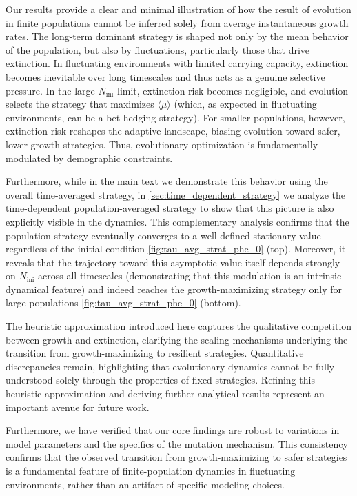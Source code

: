 \documentclass[aps,pre,reprint,10pt,superscriptaddress]{revtex4-2}
\begin{document}
Our results provide a clear and minimal illustration of how the result of evolution in finite populations cannot be inferred solely from average instantaneous growth rates. The long-term dominant strategy is shaped not only by the mean behavior of the population, but also by fluctuations, particularly those that drive extinction. In fluctuating environments with limited carrying capacity, extinction becomes inevitable over long timescales and thus acts as a genuine selective pressure. In the large-$N_\text{ini}$ limit, extinction risk becomes negligible, and evolution selects the strategy that maximizes $\langle\mu\rangle$ (which, as expected in fluctuating environments, can be a bet-hedging strategy). For smaller populations, however, extinction risk reshapes the adaptive landscape, biasing evolution toward safer, lower-growth strategies. Thus, evolutionary optimization is fundamentally modulated by demographic constraints.

Furthermore, while in the main text we demonstrate this behavior using the overall time-averaged strategy, in \cref{sec:time_dependent_strategy} we analyze the time-dependent population-averaged strategy to show that this picture is also explicitly visible in the dynamics. This complementary analysis confirms that the population strategy eventually converges to a well-defined stationary value regardless of the initial condition \cref{fig:tau_avg_strat_phe_0} (top). Moreover, it reveals that the trajectory toward this asymptotic value itself depends strongly on $N_\text{ini}$ across all timescales (demonstrating that this modulation is an intrinsic dynamical feature) and indeed reaches the growth-maximizing strategy only for large populations \cref{fig:tau_avg_strat_phe_0} (bottom).

The heuristic approximation introduced here captures the qualitative competition between growth and extinction, clarifying the scaling mechanisms underlying the transition from growth-maximizing to resilient strategies. Quantitative discrepancies remain, highlighting that evolutionary dynamics cannot be fully understood solely through the properties of fixed strategies. Refining this heuristic approximation and deriving further analytical results represent an important avenue for future work.

Furthermore, we have verified that our core findings are robust to variations in model parameters and the specifics of the mutation mechanism. This consistency confirms that the observed transition from growth-maximizing to safer strategies is a fundamental feature of finite-population dynamics in fluctuating environments, rather than an artifact of specific modeling choices.
\end{document}
